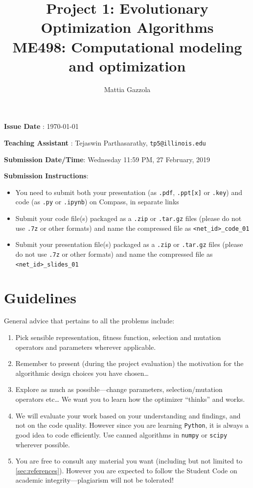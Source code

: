 \documentclass[11pt]{article}
\author{Mattia Gazzola}
\date{}
\title{Project 1: Evolutionary Optimization Algorithms\\\medskip
\large ME498: Computational modeling and optimization}
\begin{document}
\maketitle
\textbf{Issue Date} : \today

\textbf{Teaching Assistant} : Tejaswin Parthasarathy, \texttt{tp5@illinois.edu}

\textbf{Submission Date/Time}: Wednesday 11:59 PM, 27 February, 2019

\textbf{Submission Instructions}:
\begin{itemize}
\item You need to submit both your presentation (as \texttt{.pdf}, \texttt{.ppt[x]} or \texttt{.key}) and code
(as \texttt{.py} or \texttt{.ipynb}) on Compass, in separate links
\item Submit your code file(s) packaged as a \texttt{.zip} or \texttt{.tar.gz} files (please do not use
\texttt{.7z} or other formats) and name the compressed file as \texttt{<net\_id>\_code\_01}
\item Submit your presentation file(s) packaged as a \texttt{.zip} or \texttt{.tar.gz} files (please do not use
\texttt{.7z} or other formats) and name the compressed file as \texttt{<net\_id>\_slides\_01}
\end{itemize}

\section{Guidelines}
\label{sec:org0b1c9f2}
General advice that pertains to all the problems include:
\begin{enumerate}
\item Pick sensible representation, fitness function, selection and mutation
operators and parameters wherever applicable.
\item Remember to present (during the project evaluation) the motivation for the
algorithmic design choices you have chosen\ldots{}
\item Explore as much as possible---change parameters, selection/mutation
operators etc\ldots{} We want you to learn how the optimizer ``thinks'' and works.
\item We will evaluate your work based on your understanding and findings, and
not on the code quality. However since you are learning \texttt{Python}, it is
always a good idea to code efficiently. Use canned algorithms in \texttt{numpy} or
\texttt{scipy} wherever possible.
\item You are free to consult any material you want (including but not limited to
\cref{sec:references}). However you are expected to follow the Student Code
on academic integrity---plagiarism will not be tolerated!
\end{enumerate}
\end{document}
